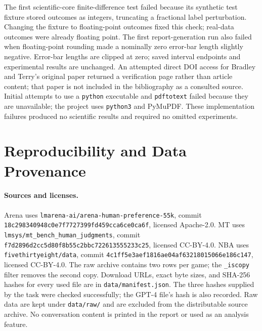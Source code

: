 \documentclass{article}
\begin{document}
The first scientific-core finite-difference test failed because its synthetic test fixture stored outcomes as integers, truncating a fractional label perturbation. Changing the fixture to floating-point outcomes fixed this check; real-data outcomes were already floating point. The first report-generation run also failed when floating-point rounding made a nominally zero error-bar length slightly negative. Error-bar lengths are clipped at zero; saved interval endpoints and experimental results are unchanged. An attempted direct DOI access for Bradley and Terry's original paper returned a verification page rather than article content; that paper is not included in the bibliography as a consulted source. Initial attempts to use a \texttt{python} executable and \texttt{pdftotext} failed because they are unavailable; the project uses \texttt{python3} and PyMuPDF. These implementation failures produced no scientific results and required no omitted experiments.



\section{Reproducibility and Data Provenance}\label{app:repro}
\paragraph{Sources and licenses.}
Arena uses \texttt{lmarena-ai/arena-human-preference-55k}, commit \texttt{18c298340948c0e7f7727399fd459cca6ce0ca6f}, licensed Apache-2.0. MT uses \texttt{lmsys/mt\_bench\_human\_judgments}, commit \texttt{f7d2896d2cc5d80f8b55c2bbc722613555233c25}, licensed CC-BY-4.0. NBA uses \texttt{fivethirtyeight/data}, commit \texttt{4c1ff5e3aef1816ae04af63218015066e186c147}, licensed CC-BY-4.0. The raw archive contains two rows per game; the \texttt{\_iscopy} filter removes the second copy. Download URLs, exact byte sizes, and SHA-256 hashes for every used file are in \texttt{data/manifest.json}. The three hashes supplied by the task were checked successfully; the GPT-4 file's hash is also recorded. Raw data are kept under \texttt{data/raw/} and are excluded from the distributable source archive. No conversation content is printed in the report or used as an analysis feature.
\end{document}
